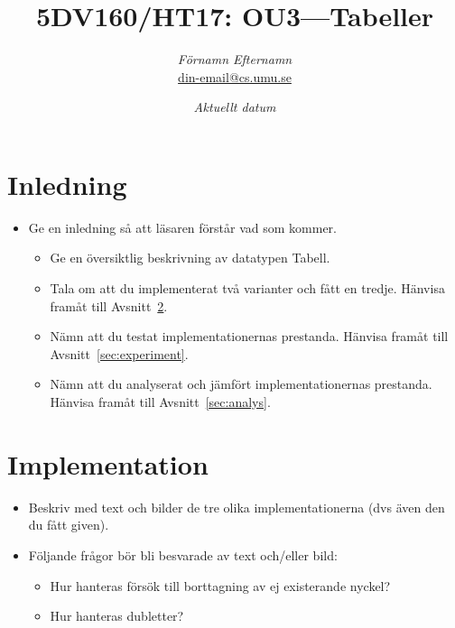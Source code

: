 \documentclass[a4paper,12pt]{article}
\newcommand{\todo}[1]{{\color{red} #1}}
\begin{document}
\title{5DV160/HT17: OU3---Tabeller}
\author{\emph{\color{red}Förnamn Efternamn}\\{\color{red}\url{din-email@cs.umu.se}}}
\date{\emph{\color{red}Aktuellt datum}}
\maketitle
\tableofcontents
\thispagestyle{empty}
\newpage




\section{Inledning}
\label{sec:inledning}

\begin{itemize}
\item \todo{Ge en inledning så att läsaren förstår vad som kommer.}
  \begin{itemize}
  \item \todo{Ge en översiktlig beskrivning av datatypen Tabell.}
  \item \todo{Tala om att du implementerat två varianter och fått en tredje. Hänvisa framåt till Avsnitt~\ref{sec:implementation}.}
  \item \todo{Nämn att du testat implementationernas prestanda. Hänvisa framåt till Avsnitt~\ref{sec:experiment}.}
  \item \todo{Nämn att du analyserat och jämfört implementationernas prestanda. Hänvisa framåt till Avsnitt~\ref{sec:analys}.}
  \end{itemize}
\end{itemize}


\section{Implementation}
\label{sec:implementation}

\begin{itemize}
\item \todo{Beskriv med text och bilder de tre olika implementationerna (dvs även den du fått given).}
\item \todo{Följande frågor bör bli besvarade av text och/eller bild:}
  \begin{itemize}
  \item \todo{Hur hanteras försök till borttagning av ej existerande nyckel?}
  \item \todo{Hur hanteras dubletter?}
  \end{itemize}
\end{itemize}
\end{document}
